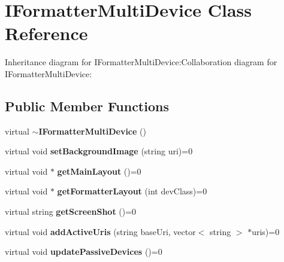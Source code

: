 \section{IFormatterMultiDevice Class Reference}
\label{classbr_1_1pucrio_1_1telemidia_1_1ginga_1_1ncl_1_1multidevice_1_1IFormatterMultiDevice}
Inheritance diagram for IFormatterMultiDevice:Collaboration diagram for IFormatterMultiDevice:\subsection*{Public Member Functions}
\begin{CompactItemize}
\item 
virtual {\bf $\sim$IFormatterMultiDevice} ()\label{classbr_1_1pucrio_1_1telemidia_1_1ginga_1_1ncl_1_1multidevice_1_1IFormatterMultiDevice_92c954125959ad695d92324807983ff7}

\item 
virtual void \textbf{setBackgroundImage} (string uri)=0\label{classbr_1_1pucrio_1_1telemidia_1_1ginga_1_1ncl_1_1multidevice_1_1IFormatterMultiDevice_754387c03ca7efd69e5cc1182e5e79ff}

\item 
virtual void $\ast$ \textbf{getMainLayout} ()=0\label{classbr_1_1pucrio_1_1telemidia_1_1ginga_1_1ncl_1_1multidevice_1_1IFormatterMultiDevice_ebc95604416e19a25715f890c2c75eba}

\item 
virtual void $\ast$ \textbf{getFormatterLayout} (int devClass)=0\label{classbr_1_1pucrio_1_1telemidia_1_1ginga_1_1ncl_1_1multidevice_1_1IFormatterMultiDevice_6b2058ae15d0407e015abde3d549b64a}

\item 
virtual string \textbf{getScreenShot} ()=0\label{classbr_1_1pucrio_1_1telemidia_1_1ginga_1_1ncl_1_1multidevice_1_1IFormatterMultiDevice_f589cb0cbad90a5a2938587670c4543d}

\item 
virtual void \textbf{addActiveUris} (string baseUri, vector$<$ string $>$ $\ast$uris)=0\label{classbr_1_1pucrio_1_1telemidia_1_1ginga_1_1ncl_1_1multidevice_1_1IFormatterMultiDevice_e62c87f198c3c40e2f0d0440a9760310}

\item 
virtual void \textbf{updatePassiveDevices} ()=0\label{classbr_1_1pucrio_1_1telemidia_1_1ginga_1_1ncl_1_1multidevice_1_1IFormatterMultiDevice_02d5403e3ffc48312c5e66df3addcf16}

\end{CompactItemize}
